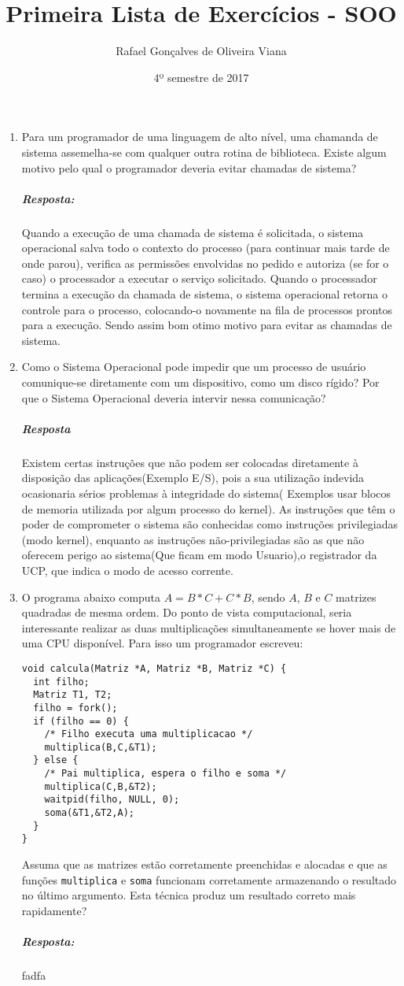 \documentclass[12pt]{article}
\title{Primeira Lista de Exercícios - SOO}
\author{Rafael Gonçalves de Oliveira Viana}
\date{4º semestre de 2017}
\begin{document}
	
\maketitle

\begin{enumerate}
\item
Para um programador de uma linguagem de alto nível, uma chamanda de sistema assemelha-se com qualquer outra rotina de biblioteca. Existe algum motivo pelo qual o programador deveria evitar chamadas de sistema?

 \subparagraph{Resposta:}
Quando a execução de uma chamada de sistema é solicitada, o sistema operacional salva todo o contexto do processo (para continuar mais tarde de onde parou), verifica as permissões envolvidas no pedido e autoriza (se for o caso) o processador a executar o serviço solicitado. Quando o processador termina a execução da chamada de sistema, o sistema operacional retorna o controle para o processo, colocando-o novamente na fila de processos prontos para a execução.
Sendo assim bom otimo motivo para evitar as chamadas de sistema.
 
\item
Como o Sistema Operacional pode impedir que um processo de usuário
comunique-se diretamente com um dispositivo, como um disco rígido? Por
que o Sistema Operacional deveria intervir nessa comunicação?
\subparagraph{Resposta}
	Existem certas instruções que não podem ser
	colocadas diretamente à disposição das aplicações(Exemplo E/S), pois a sua utilização indevida ocasionaria sérios problemas à integridade do sistema(  Exemplos usar blocos de memoria utilizada por algum processo do kernel). As instruções que têm o poder de comprometer o sistema são conhecidas como instruções privilegiadas (modo kernel), enquanto as instruções não-privilegiadas são as que não oferecem perigo ao sistema(Que ficam em modo Usuario),o registrador da UCP, que indica o modo de acesso corrente.
\item
O programa abaixo computa $A = B*C + C*B$, sendo $A$, $B$ e $C$
matrizes quadradas de mesma ordem. Do ponto de vista computacional,
seria interessante realizar as duas multiplicações simultaneamente se
hover mais de uma CPU disponível. Para isso um programador escreveu:
\begin{verbatim}
void calcula(Matriz *A, Matriz *B, Matriz *C) {
  int filho;
  Matriz T1, T2;
  filho = fork();
  if (filho == 0) {
    /* Filho executa uma multiplicacao */
    multiplica(B,C,&T1);
  } else {
    /* Pai multiplica, espera o filho e soma */
    multiplica(C,B,&T2);
    waitpid(filho, NULL, 0);
    soma(&T1,&T2,A);
  }
}
\end{verbatim}
Assuma que as matrizes estão corretamente preenchidas e alocadas e que
as funções \verb+multiplica+ e \verb+soma+ funcionam corretamente
armazenando o resultado no último argumento. Esta técnica produz um
resultado correto mais rapidamente?
 \subparagraph{Resposta:}
 fadfa
 

\end{enumerate}
\end{document}
